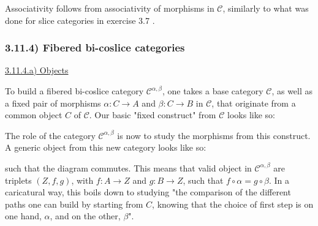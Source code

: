 \documentclass[12pt, letterpaper, twoside]{report}
\begin{document}
Associativity follows from associativity of morphisms in $\mathcal{C}$, similarly to what was done for slice categories in exercise 3.7 .



\subsubsection*{3.11.4) Fibered bi-coslice categories}

\vspace{5mm}
\underline{3.11.4.a) Objects}

To build a fibered bi-coslice category $\mathcal{C}^{\alpha, \beta}$, one takes a base category $\mathcal{C}$, as well as a fixed pair of morphisms $\alpha : C \to A$ and $\beta : C \to B$ in $\mathcal{C}$, that originate from a common object $C$ of $\mathcal{C}$. Our basic "fixed construct" from $\mathcal{C}$ looks like so: 


The role of the category $\mathcal{C}^{\alpha, \beta}$ is now to study the morphisms from this construct. A generic object from this new category looks like so:


such that the diagram commutes. This means that valid object in $\mathcal{C}^{\alpha, \beta}$ are triplets $(Z, f, g)$, with $f : A \to Z$ and $g : B \to Z$, such that $f \circ \alpha = g \circ \beta$. In a caricatural way, this boils down to studying "the comparison of the different paths one can build by starting from $C$, knowing that the choice of first step is on one hand, $\alpha$, and on the other, $\beta$".
\end{document}

